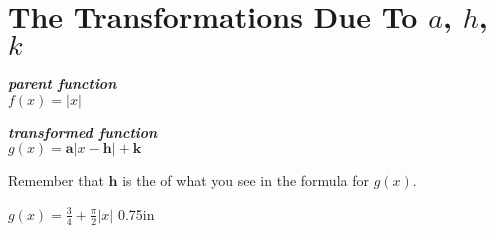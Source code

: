 \section{The Transformations Due To $a$, $h$, $k$}

\begin{tcbraster}[
    raster equal height,
    raster left skip = 1in, raster right skip = 1in, 
    raster column skip = 0.5in,
    raster before skip = 1\baselineskip, raster after skip = 1\baselineskip,
    ]
    \begin{tcolorbox}[]
        \centering
        {\bfseries\itshape parent function}\\[0.5\baselineskip]
        \large
        $f(x) = |x|$
    \end{tcolorbox}
    \begin{tcolorbox}[]
        \centering
        {\bfseries\itshape transformed function}\\[0.5\baselineskip]
        \large
        $g(x) = \bm{a} |x-\bm{h}| + \bm{k}$
    \end{tcolorbox}
\end{tcbraster}

\begin{tcbraster}[]
\end{tcbraster}


\begin{myWarningBox}
    \begin{center}
        Remember that $\bm{h}$ is the  
        of what you see in the formula for $g(x)$.
    \end{center}
\end{myWarningBox}



{
    $g(x) = \frac{3}{4} + \frac{\pi}{2}|x|$
}{0.75in}


